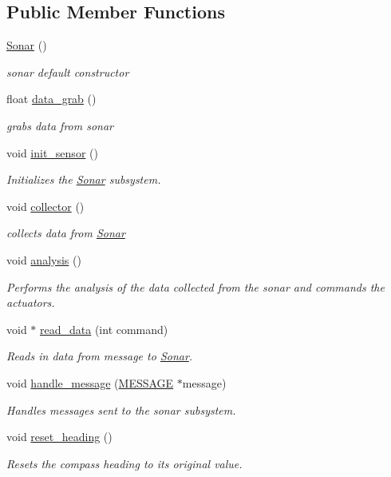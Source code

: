 \subsection*{Public Member Functions}
\begin{DoxyCompactItemize}
\item 
\hyperlink{classSonar_a71ef009d138f1e372fc35ca0cb6e85e2}{Sonar} ()
\begin{DoxyCompactList}\small\item\em sonar default constructor \end{DoxyCompactList}\item 
float \hyperlink{classSonar_aa4e807cbed15ce1d46ddcef05b6b59fb}{data\-\_\-grab} ()
\begin{DoxyCompactList}\small\item\em grabs data from sonar \end{DoxyCompactList}\item 
void \hyperlink{classSonar_af91d04cbc441084ba608a49c2be88d5b}{init\-\_\-sensor} ()
\begin{DoxyCompactList}\small\item\em Initializes the \hyperlink{classSonar}{Sonar} subsystem. \end{DoxyCompactList}\item 
void \hyperlink{classSonar_a38b0e409082be17e7098b2e471bab4a8}{collector} ()
\begin{DoxyCompactList}\small\item\em collects data from \hyperlink{classSonar}{Sonar} \end{DoxyCompactList}\item 
void \hyperlink{classSonar_a11a32c64528f8e69fdde4722f3b3bc7b}{analysis} ()
\begin{DoxyCompactList}\small\item\em Performs the analysis of the data collected from the sonar and commands the actuators. \end{DoxyCompactList}\item 
void $\ast$ \hyperlink{classSonar_a54f55470741873f333ad8af8a98affc8}{read\-\_\-data} (int command)
\begin{DoxyCompactList}\small\item\em Reads in data from message to \hyperlink{classSonar}{Sonar}. \end{DoxyCompactList}\item 
void \hyperlink{classSonar_a5f9b0f57b5a05b03b0dcb5ab830592ff}{handle\-\_\-message} (\hyperlink{SUBSYS__COMMANDS_8h_ad814416fc1a8c675bea2687d96088a8f}{M\-E\-S\-S\-A\-G\-E} $\ast$message)
\begin{DoxyCompactList}\small\item\em Handles messages sent to the sonar subsystem. \end{DoxyCompactList}\item 
void \hyperlink{classSonar_a9648cfd15b2f2ef88c2094b0dfd19a6c}{reset\-\_\-heading} ()
\begin{DoxyCompactList}\small\item\em Resets the compass heading to its original value. \end{DoxyCompactList}\end{DoxyCompactItemize}
